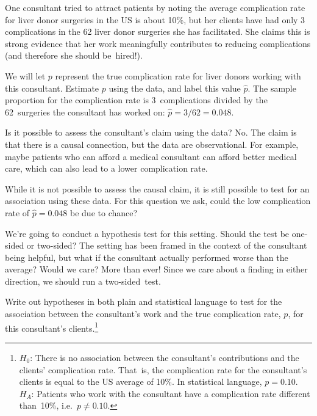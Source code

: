 One consultant tried to attract patients by noting the average complication rate for liver donor surgeries in the US is about 10\%, but her clients have had only 3 complications in the 62 liver donor surgeries she has facilitated. She claims this is strong evidence that her work meaningfully contributes to reducing complications (and therefore she should be~hired!).

\begin{example}{We will let $p$ represent the true complication rate for liver donors working with this consultant. Estimate $p$ using the data, and label this value $\hat{p}$.}
The sample proportion for the complication rate is 3~complications divided by the 62~surgeries the consultant has worked on: $\hat{p} = 3/62 = 0.048$.
\end{example}

\begin{example}{Is it possible to assess the consultant's claim using the data?}
No. The claim is that there is a causal connection, but the data are observational. For example, maybe patients who can afford a medical consultant can afford better medical care, which can also lead to a lower complication rate.

While it is not possible to assess the causal claim, it is still possible to test for an association using these data. For this question we ask, could the low complication rate of $\hat{p} = 0.048$ be due to chance?
\end{example}

\begin{example}{We're going to conduct a hypothesis test for this setting. Should the test be one-sided or two-sided?}
The setting has been framed in the context of the consultant being helpful, but what if the consultant actually performed worse than the average? Would we care? More than ever! Since we care about a finding in either direction, we should run a two-sided~test.
\end{example}

\begin{exercise}\label{hypForAssessingConsultantWorkInLiverTransplants}
Write out hypotheses in both plain and statistical language to test for the association between the consultant's work and the true complication rate, $p$, for this consultant's clients.\footnote{$H_0$: There is no association between the consultant's contributions and the clients' complication rate. That~is, the complication rate for the consultant's clients is equal to the US average of 10\%. In statistical language, $p=0.10$. $H_A$: Patients who work with the consultant have a complication rate different than~10\%, i.e.~$p \neq 0.10$.}
\end{exercise}

